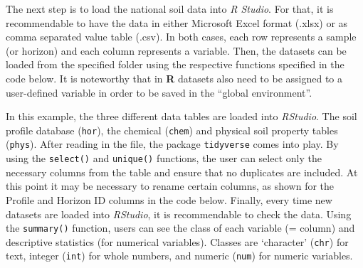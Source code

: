 \documentclass[
  10pt,
  b5paper,
  oneside]{book}
\begin{document}
The next step is to load the national soil data into \emph{R Studio}. For that, it is recommendable to have the data in either Microsoft Excel format (.xlsx) or as comma separated value table (.csv). In both cases, each row represents a sample (or horizon) and each column represents a variable. Then, the datasets can be loaded from the specified folder using the respective functions specified in the code below. It is noteworthy that in \textbf{R} datasets also need to be assigned to a user-defined variable in order to be saved in the ``global environment''.

In this example, the three different data tables are loaded into \emph{RStudio}. The soil profile database (\texttt{hor}), the chemical (\texttt{chem}) and physical soil property tables (\texttt{phys}). After reading in the file, the package \texttt{tidyverse} comes into play. By using the \texttt{select()} and \texttt{unique()} functions, the user can select only the necessary columns from the table and ensure that no duplicates are included. At this point it may be necessary to rename certain columns, as shown for the Profile and Horizon ID columns in the code below.
Finally, every time new datasets are loaded into \emph{RStudio}, it is recommendable to check the data. Using the \texttt{summary()} function, users can see the class of each variable (= column) and descriptive statistics (for numerical variables). Classes are `character' (\texttt{chr}) for text, integer (\texttt{int}) for whole numbers, and numeric (\texttt{num}) for numeric variables.
\end{document}
